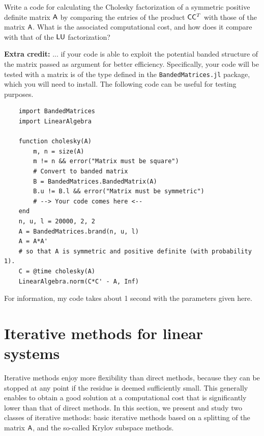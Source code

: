 \begin{compexercise}
    \label{exercise:linear_cholesky}
    Write a code for calculating the Cholesky factorization of a symmetric positive definite matrix $\mathsf A$ by comparing the entries of the product $\mathsf C \mathsf C^T$ with those of the matrix $\mathsf A$.
    What is the associated computational cost,
    and how does it compare with that of the $\mathsf L \mathsf U$ factorization?

    \noindent \textbf{Extra credit:} ... if your code is able to exploit the potential banded structure of the matrix passed as argument for better efficiency.
    Specifically, your code will be tested with a matrix is of the type  defined in the \texttt{BandedMatrices.jl} package,
    which you will need to install.
    The following code can be useful for testing purposes.
    \begin{verbatim}
    import BandedMatrices
    import LinearAlgebra

    function cholesky(A)
        m, n = size(A)
        m != n && error("Matrix must be square")
        # Convert to banded matrix
        B = BandedMatrices.BandedMatrix(A)
        B.u != B.l && error("Matrix must be symmetric")
        # --> Your code comes here <--
    end
    n, u, l = 20000, 2, 2
    A = BandedMatrices.brand(n, u, l)
    A = A*A'
    # so that A is symmetric and positive definite (with probability 1).
    C = @time cholesky(A)
    LinearAlgebra.norm(C*C' - A, Inf)
    \end{verbatim}
    For information, my code takes about 1 second with the parameters given here.
\end{compexercise}

\section{Iterative methods for linear systems}%
\label{sec:iterative_methods}
Iterative methods enjoy more flexibility than direct methods,
because they can be stopped at any point if the residue is deemed sufficiently small.
This generally enables to obtain a good solution at a computational cost that is significantly lower than that of direct methods.
In this section,
we present and study two classes of iterative methods:
basic iterative methods based on a splitting of the matrix $\mathsf A$,
and the so-called Krylov subspace methods.

